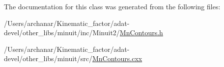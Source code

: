 The documentation for this class was generated from the following files\+:\begin{DoxyCompactItemize}
\item 
/\+Users/archanar/\+Kinematic\+\_\+factor/adat-\/devel/other\+\_\+libs/minuit/inc/\+Minuit2/\mbox{\hyperlink{adat-devel_2other__libs_2minuit_2inc_2Minuit2_2MnContours_8h}{Mn\+Contours.\+h}}\item 
/\+Users/archanar/\+Kinematic\+\_\+factor/adat-\/devel/other\+\_\+libs/minuit/src/\mbox{\hyperlink{adat-devel_2other__libs_2minuit_2src_2MnContours_8cxx}{Mn\+Contours.\+cxx}}\end{DoxyCompactItemize}
